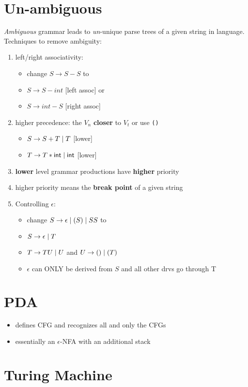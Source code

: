 \documentclass[10pt,a4paper,fleqn,landscape]{article}
\begin{document}
\begin{multicols*}{3}
\section*{Un-ambiguous}
\emph{Ambiguous} grammar leads to \emph{un}-unique parse trees of a given string in language.  Techniques to remove ambiguity:
\begin{enumerate}
\item left/right associativity:
  \begin{itemize}
    \item[] change \(S \rightarrow S - S\) to
    \item \(S \rightarrow S - int\) [left assoc] or
    \item \(S \rightarrow int - S\) [right assoc]
  \end{itemize}
\item higher precedence: the \(V_{n}\) \textbf{closer} to \(V_{t}\) or use \verb|()|
  \begin{itemize}
    \item \(S \rightarrow S + T \;|\; T\) [lower]
    \item \(T \rightarrow T * \mathsf{int} \;|\; \mathsf{int}\) [lower]
    \end{itemize}
  \item[] \textbf{lower} level grammar productions have \textbf{higher} priority
  \item[] higher priority means the \textbf{break point} of a given string

\item Controlling \(\epsilon\):
  \begin{itemize}
    \item[] change \(S \rightarrow  \epsilon \;|\; (S) \;|\; SS\) to
    \item \(S \rightarrow \epsilon \;|\; T\)
    \item \(T \rightarrow TU \;|\; U\) and \(U \rightarrow () \;|\; (T)\)
    \item[] \(\epsilon\) can ONLY be derived from \(S\) and all other drvs go through T
  \end{itemize}
\end{enumerate}
\section*{PDA}
\begin{itemize}
\item defines CFG and recognizes all and only the CFGs
\item essentially an \(\epsilon\)-NFA with an additional stack
\end{itemize}
\section*{Turing Machine}

\end{multicols*}
\end{document}

